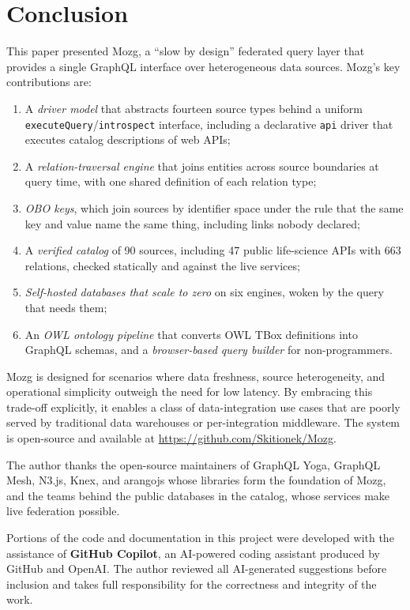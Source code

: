 \documentclass[sigconf,nonacm]{acmart}
\begin{document}
\section{Conclusion}
\label{sec:conclusion}

This paper presented Mozg, a ``slow by design'' federated query layer that
provides a single GraphQL interface over heterogeneous data sources.
Mozg's key contributions are:
\begin{enumerate}
  \item A \emph{driver model} that abstracts fourteen source types
        behind a uniform \texttt{executeQuery}/\texttt{introspect}
        interface, including a declarative \texttt{api} driver that
        executes catalog descriptions of web APIs;
  \item A \emph{relation-traversal engine} that joins entities across
        source boundaries at query time, with one shared definition of
        each relation type;
  \item \emph{OBO keys}, which join sources by identifier space under
        the rule that the same key and value name the same thing,
        including links nobody declared;
  \item A \emph{verified catalog} of 90 sources, including 47 public
        life-science APIs with 663 relations, checked statically and
        against the live services;
  \item \emph{Self-hosted databases that scale to zero} on six engines,
        woken by the query that needs them;
  \item An \emph{OWL ontology pipeline} that converts OWL TBox
        definitions into GraphQL schemas, and a \emph{browser-based
        query builder} for non-programmers.
\end{enumerate}

Mozg is designed for scenarios where data freshness, source
heterogeneity, and operational simplicity outweigh the need for
low latency.  By embracing this trade-off explicitly,
it enables a class of data-integration use cases that are poorly
served by traditional data warehouses or per-integration middleware.
The system is open-source and available at
\url{https://github.com/Skitionek/Mozg}.

\begin{acks}
The author thanks the open-source maintainers of GraphQL Yoga,
GraphQL Mesh, N3.js, Knex, and arangojs whose libraries form the
foundation of Mozg, and the teams behind the public databases in the
catalog, whose services make live federation possible.

Portions of the code and documentation in this project were developed
with the assistance of \textbf{GitHub Copilot}, an AI-powered coding
assistant produced by GitHub and OpenAI\@.  The author reviewed all
AI-generated suggestions before inclusion and takes full responsibility
for the correctness and integrity of the work.
\end{acks}



\end{document}

